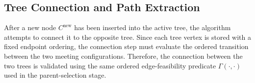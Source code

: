 \documentclass{pas}
\begin{document}


\subsection{Tree Connection and Path Extraction}
\label{subsec:gcr_tree_connection}

After a new node \(C^{\mathrm{new}}\) has been inserted into the active tree,
the algorithm attempts to connect it to the opposite tree. Since each tree vertex
is stored with a fixed endpoint ordering, the connection step must evaluate the
ordered transition between the two meeting configurations. Therefore, the
connection between the two trees is validated using the same ordered
edge-feasibility predicate \(\Gamma(\cdot,\cdot)\) used in the parent-selection
stage.
\end{document}
